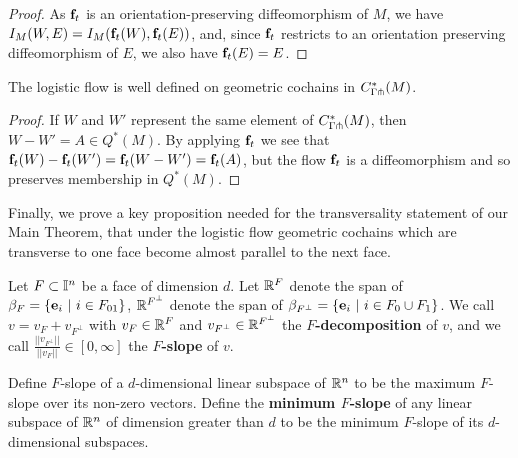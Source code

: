 \begin{proof}
	As $\mathbf{f}_t$ is an orientation-preserving diffeomorphism of $M$, we have $I_M(W, E) = I_M(\mathbf{f}_t(W), \mathbf{f}_t(E))$, and, since $\mathbf{f}_t$ restricts to an orientation preserving diffeomorphism of $E$, we also have $\mathbf{f}_t(E) = E$.
\end{proof}

\begin{lemma}
	The logistic flow is well defined on geometric cochains in $C^*_{\Gamma \pitchfork}(M)$.
\end{lemma}

\begin{proof}
	If ${W}$ and ${W}'$ represent the same element of $C^*_{\Gamma \pitchfork}(M)$, then $ W- W' = A \in Q^*(M)$.
	By applying $\mathbf{f}_t$ we see that $\mathbf{f}_t( W)-\mathbf{f}_t( W') = \mathbf{f}_t( W - W') = \mathbf{f}_t(A)$, but the flow $\mathbf{f}_t$ is a diffeomorphism and so preserves membership in $Q^*(M)$.
\end{proof}

Finally, we prove a key proposition needed for the transversality statement of our Main Theorem,  that under the
logistic flow geometric cochains which are transverse to one face become almost parallel to the next face.

\begin{definition}
Let $F \subset \mathbb{I}^n$ be a  face of dimension $d$. Let $\mathbb{R}^F$ denote the span of
$\beta_F = \{\mathbf{e}_i\ |\ i \in F_{01}\}$,  $\mathbb{R}^{F^\perp}$ denote the span of
 $\beta_{F^\perp} = \{\mathbf{e}_i\ |\ i \in F_0 \cup F_1\}$.  We call $v =  v_F +   v_{F^\perp}$ with
 $v_F \in \mathbb{R}^F$ and $v_{F^\perp} \in \mathbb{R}^{F^\perp}$
  the {\bf $F$-decomposition} of $v$, and we call $\frac{|| v_{F^\perp}||}{||v_{F}||}  \in [0,\infty]$ the {\bf $F$-slope} of $v$.

 Define  $F$-slope of a $d$-dimensional linear subspace of $\mathbb{R}^n$ to be
 the maximum $F$-slope over its non-zero vectors.   Define the {\bf minimum  $F$-slope}
 of any linear subspace of $\mathbb{R}^n$ of dimension greater than $d$
 to be the minimum  $F$-slope of its $d$-dimensional subspaces.
 \begin{comment}
 A vector $v$ is (within) {\bf $\varepsilon$-parallel} to $F$ if its slope with respect to $F$ is less than
 $\varepsilon$, and a
 subspace of $\R^n$ is $\varepsilon$-parallel to $F$ if all of its non-zero vectors are.
A c-manifold $W$ over $\interval^n$ is $\varepsilon$-parallel to $F$ if the image of the Jacobian of $r_W$ is
$\varepsilon$-parallel to $F$.
\end{comment}
\end{definition}

